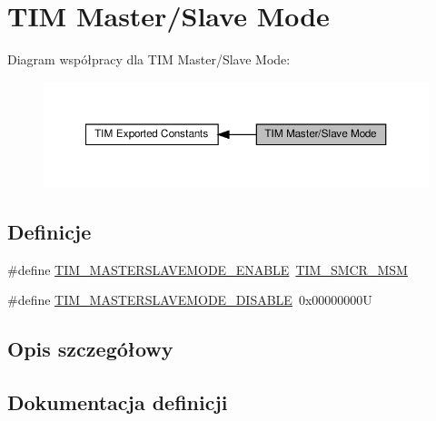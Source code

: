\hypertarget{group___t_i_m___master___slave___mode}{}\section{T\+IM Master/\+Slave Mode}
\label{group___t_i_m___master___slave___mode}
Diagram współpracy dla T\+IM Master/\+Slave Mode\+:\nopagebreak
\begin{figure}[H]
\begin{center}
\leavevmode
\includegraphics[width=350pt]{group___t_i_m___master___slave___mode}
\end{center}
\end{figure}
\subsection*{Definicje}
\begin{DoxyCompactItemize}
\item 
\#define \hyperlink{group___t_i_m___master___slave___mode_gafdc0de07db4688aa8c87cf03220aaf28}{T\+I\+M\+\_\+\+M\+A\+S\+T\+E\+R\+S\+L\+A\+V\+E\+M\+O\+D\+E\+\_\+\+E\+N\+A\+B\+LE}~\hyperlink{group___peripheral___registers___bits___definition_ga52101db4ca2c7b3003f1b16a49b2032c}{T\+I\+M\+\_\+\+S\+M\+C\+R\+\_\+\+M\+SM}
\item 
\#define \hyperlink{group___t_i_m___master___slave___mode_ga58ff99ef1d6d6f187e3615f9d3ec3b8b}{T\+I\+M\+\_\+\+M\+A\+S\+T\+E\+R\+S\+L\+A\+V\+E\+M\+O\+D\+E\+\_\+\+D\+I\+S\+A\+B\+LE}~0x00000000U
\end{DoxyCompactItemize}


\subsection{Opis szczegółowy}


\subsection{Dokumentacja definicji}
\mbox{\label{group___t_i_m___master___slave___mode_ga58ff99ef1d6d6f187e3615f9d3ec3b8b}} 

